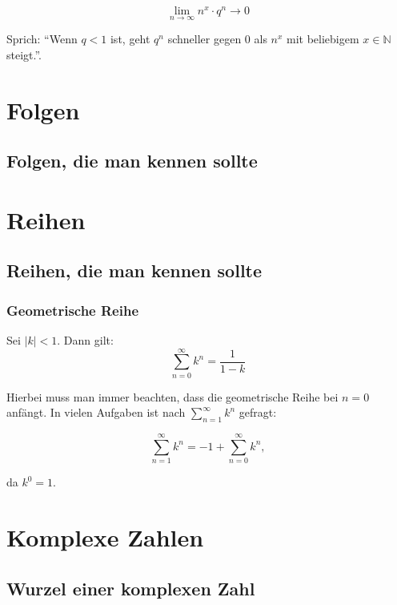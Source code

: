 \documentclass[a4paper, 16pt]{article}
\begin{document}
	\begin{equation*}
		\lim\limits_{n \to \infty}{n^x \cdot q^n} \to 0
	\end{equation*}

	Sprich: \enquote{Wenn $q < 1$ ist, geht $q^n$ schneller gegen 0 als $n^x$ mit beliebigem $x \in \mathbb{N}$ steigt.}.

	\section{Folgen}

	\subsection{Folgen, die man kennen sollte}

	\section{Reihen}

	\subsection{Reihen, die man kennen sollte}

	\subsubsection{Geometrische Reihe}

	Sei $|k| < 1$. Dann gilt:
	\begin{equation*}
		\sum\limits_{n = 0}^{\infty}{k^n} = \frac{1}{1 - k}
	\end{equation*}

	Hierbei muss man immer beachten, dass die geometrische Reihe bei $n = 0$ anfängt.
	In vielen Aufgaben ist nach $\sum_{n = 1}^{\infty}{k^n}$ gefragt:
	
	\begin{equation*}
		\sum\limits_{n = 1}^{\infty}{k^n} = -1 + \sum\limits_{n = 0}^{\infty}{k^n},
	\end{equation*}

	da $k^0 = 1$.

	\section{Komplexe Zahlen}

	\subsection{Wurzel einer komplexen Zahl}
\end{document}
